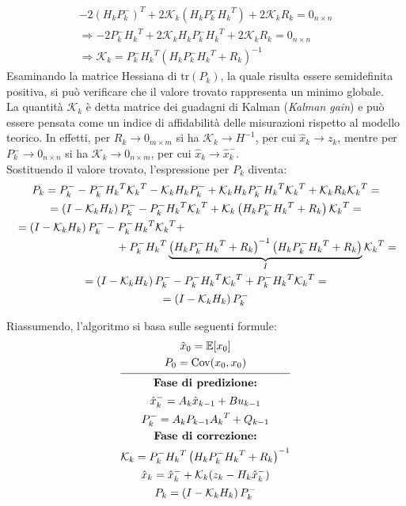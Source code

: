 \documentclass[12pt,a4paper,openright,twoside]{book}
\begin{document}
\begin{gather*}
-2(H_kP_k^-)^T+2\mathcal{K}_k\left(H_kP_k^-{H_k}^T\right)+2\mathcal{K}_kR_k=0_{n\times n} \\
\Rightarrow-2P_k^-{H_k}^T+2\mathcal{K}_kH_kP_k^-{H_k}^T+2\mathcal{K}_kR_k=0_{n\times n} \\
\Rightarrow\mathcal{K}_k=P_k^-{H_k}^T\left(H_kP_k^-{H_k}^T+R_k\right)^{-1}
\end{gather*}
Esaminando la matrice Hessiana di $\mathrm{tr}(P_k)$, la quale risulta essere semidefinita positiva, si può verificare che il valore trovato rappresenta un minimo globale. \\
La quantità $\mathcal{K}_k$ è detta matrice dei guadagni di Kalman (\textit{Kalman gain}) e può essere pensata come un indice di affidabilità delle misurazioni rispetto al modello teorico. In effetti, per $R_k\to 0_{m\times m}$ si ha $\mathcal{K}_k\to H^{-1}$, per cui $\hat{x}_k\to z_k$, mentre per $P_k^-\to 0_{n\times n}$ si ha $\mathcal{K}_k\to 0_{n\times m}$, per cui $\hat{x}_k\to \hat{x}_k^-$. \\

Sostituendo il valore trovato, l'espressione per $P_k$ diventa:
\begin{gather*}
P_k=P_k^--P_k^-{H_k}^T{\mathcal{K}_k}^T-\mathcal{K}_kH_kP_k^-+\mathcal{K}_kH_kP_k^-{H_k}^T{\mathcal{K}_k}^T+\mathcal{K}_kR_k{\mathcal{K}_k}^T= \\
=\left(I-\mathcal{K}_kH_k\right)P_k^--P_k^-{H_k}^T{\mathcal{K}_k}^T+\mathcal{K}_k\left(H_kP_k^-{H_k}^T+R_k\right){\mathcal{K}_k}^T= \\
\begin{multlined}[\textwidth]
=\left(I-\mathcal{K}_kH_k\right)P_k^--P_k^-{H_k}^T{\mathcal{K}_k}^T+ \\
+P_k^-{H_k}^T\underbrace{\left(H_kP_k^-{H_k}^T+R_k\right)^{-1}\left(H_kP_k^-{H_k}^T+R_k\right)}_{I}{\mathcal{K}_k}^T=
\end{multlined} \\
=\left(I-\mathcal{K}_kH_k\right)P_k^--P_k^-{H_k}^T{\mathcal{K}_k}^T+P_k^-{H_k}^T{\mathcal{K}_k}^T= \\
=\left(I-\mathcal{K}_kH_k\right)P_k^-
\end{gather*}

Riassumendo, l'algoritmo si basa sulle seguenti formule:
\begin{gather*}
\hat{x}_0=\mathbb{E}[x_0] \\
P_0=\mathrm{Cov}(x_0,x_0) \\[0.2\baselineskip]
\hline \\[-0.8\baselineskip]
\textbf{Fase di predizione:} \\
\hat{x}_k^-=A_k\hat{x}_{k-1}+Bu_{k-1} \\
P_k^-=A_kP_{k-1}{A_k}^T+Q_{k-1} \\
\textbf{Fase di correzione:} \\
\mathcal{K}_k=P_k^-{H_k}^T\left(H_kP_k^-{H_k}^T+R_k\right)^{-1} \\
\hat{x}_k=\hat{x}_k^-+\mathcal{K}_k(z_k-H_k\hat{x}_k^-) \\
P_k=\left(I-\mathcal{K}_kH_k\right)P_k^-
\end{gather*}
\end{document}
